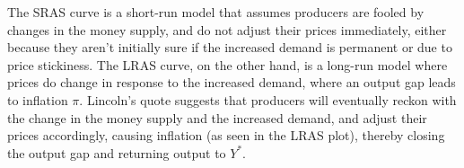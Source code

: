\begin{homeworkProblem}[2]
    The SRAS curve is a short-run model that assumes producers are
    fooled by changes in the money supply, and do not adjust their prices
    immediately, either because they aren't initially sure if the increased 
    demand is permanent or due to price stickiness. The LRAS curve, on the 
    other hand, is a long-run model where prices do change in response to
    the increased demand, where an output gap leads to inflation $\pi$.
    Lincoln's quote suggests that producers will eventually reckon 
    with the change in the money supply and the increased demand, and 
    adjust their prices accordingly, causing inflation (as seen in the
    LRAS plot), thereby closing the output gap and returning output to $Y^*$.
    
\end{homeworkProblem}